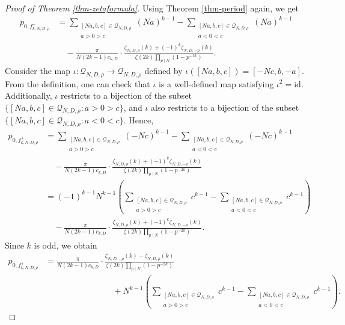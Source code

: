 \documentclass[12pt]{amsart}
\numberwithin{equation}{section}
\theoremstyle{definition}
\begin{document}
\begin{proof}[Proof of Theorem \ref{thm-zetaformula}]
    Using Theorem \ref{thm-period} again, we get
    \begin{align*}
        p_{0,f_{k,N,D,\rho}^{+}}&=\sum\limits_{\substack{[Na,b,c]\in\mathcal{Q}_{N,D,\rho} \\ a>0>c}}(Na)^{k-1}-\sum\limits_{\substack{[Na,b,c]\in\mathcal{Q}_{N,D,\rho} \\ a<0<c}}(Na)^{k-1}\\
        &\quad -\frac{\pi}{N(2k-1)c_{k,D}}\cdot\frac{\zeta_{N,D,\rho}(k)+(-1)^{k}\zeta_{N,D,-\rho}(k)}{\zeta(2k)\prod_{p\mid N}(1-p^{-2k})}.
    \end{align*}
    Consider the map $\iota:\mathcal{Q}_{N,D,\rho}\rightarrow\mathcal{Q}_{N,D,\rho}$ defined by $\iota([Na,b,c])=[-Nc,b,-a]$. From the definition, one can check that $\iota$ is a well-defined map satisfying $\iota^{2}=\mathrm{id}$. Additionally, $\iota$ restricts to a bijection of the subset $\{[Na,b,c]\in\mathcal{Q}_{N,D,\rho}:a>0>c\}$, and $\iota$ also restricts to a bijection of the subset $\{[Na,b,c]\in\mathcal{Q}_{N,D,\rho}:a<0<c\}$. Hence,
    \begin{align*}
        p_{0,f_{k,N,D,\rho}^{+}}&=\sum\limits_{\substack{[Na,b,c]\in\mathcal{Q}_{N,D,\rho} \\ a>0>c}}(-Nc)^{k-1}-\sum\limits_{\substack{[Na,b,c]\in\mathcal{Q}_{N,D,\rho} \\ a<0<c}}(-Nc)^{k-1}\\
        &\quad -\frac{\pi}{N(2k-1)c_{k,D}}\cdot\frac{\zeta_{N,D,\rho}(k)+(-1)^{k}\zeta_{N,D,-\rho}(k)}{\zeta(2k)\prod_{p\mid N}(1-p^{-2k})}\\
        &=(-1)^{k-1}N^{k-1}\left(\sum\limits_{\substack{[Na,b,c]\in\mathcal{Q}_{N,D,\rho} \\ a>0>c}}c^{k-1}-\sum\limits_{\substack{[Na,b,c]\in\mathcal{Q}_{N,D,\rho} \\ a<0<c}}c^{k-1}\right)\\
        &\quad -\frac{\pi}{N(2k-1)c_{k,D}}\cdot\frac{\zeta_{N,D,\rho}(k)+(-1)^{k}\zeta_{N,D,-\rho}(k)}{\zeta(2k)\prod_{p\mid N}(1-p^{-2k})}.
    \end{align*}
    Since $k$ is odd, we obtain
    \begin{equation}\label{eq-secondleading}
        \begin{split}
            p_{0,f_{k,N,D,\rho}^{+}}&=\frac{\pi}{N(2k-1)c_{k,D}}\cdot\frac{\zeta_{N,D,-\rho}(k)-\zeta_{N,D,\rho}(k)}{\zeta(2k)\prod_{p\mid N}(1-p^{-2k})}\\
            &\qquad\qquad\qquad\qquad+N^{k-1}\left(\sum\limits_{\substack{[Na,b,c]\in\mathcal{Q}_{N,D,\rho} \\ a>0>c}}c^{k-1}-\sum\limits_{\substack{[Na,b,c]\in\mathcal{Q}_{N,D,\rho} \\ a<0<c}}c^{k-1}\right).

\end{split}
\end{equation}
\end{proof}
\end{document}
